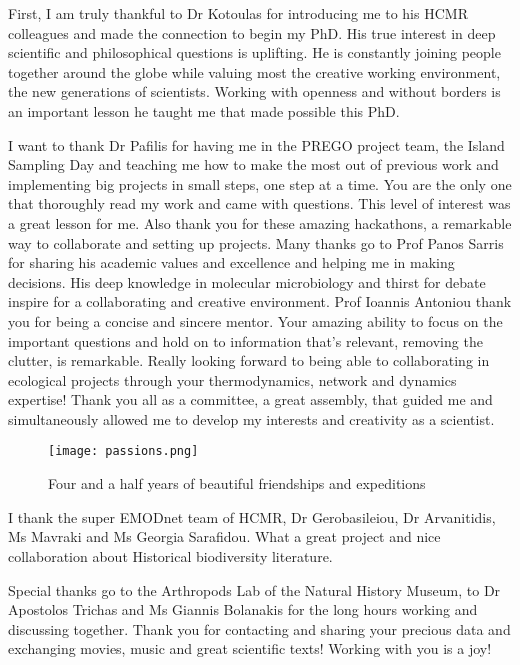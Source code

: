 \documentclass[
11pt, %
english, %
singlespacing, %
liststotoc, %
toctotoc, %
headsepline, %
]{MastersDoctoralThesis} %
\begin{document}
\begin{acknowledgements}
\addchaptertocentry{\acknowledgementname} %

First, I am truly thankful to Dr Kotoulas for introducing me to his HCMR colleagues and
made the connection to begin my PhD.
His true interest in deep scientific and philosophical questions is uplifting. He is constantly
joining people together around the globe while valuing most the creative working environment,
the new generations of scientists. Working with openness and without borders is an
important lesson he taught me that made possible this PhD.

I want to thank Dr Pafilis for having me in the PREGO project team, the Island Sampling
Day and teaching me how to make the most out
of previous work and implementing big projects in small steps, one step at a time. You are the only one that 
thoroughly read my work and came with questions. This level of interest was a great lesson for me. Also thank you 
for these amazing hackathons, a remarkable way to collaborate and setting up projects.
Many thanks go to Prof Panos Sarris for sharing his academic values and excellence and helping me in making
decisions. His deep knowledge in molecular microbiology and thirst for debate inspire for
a collaborating and creative environment. 
Prof Ioannis Antoniou thank you for being a concise and sincere mentor. Your amazing ability to focus
on the important questions and hold on to information that's relevant, removing the clutter, 
is remarkable. Really looking forward to being able to collaborating in ecological 
projects through your thermodynamics, network and dynamics expertise!
Thank you all as a committee, a great assembly, that guided me and simultaneously 
allowed me to develop my interests and creativity as a scientist.

\begin{figure}[hbt!] 
    \centering\texttt{[image: passions.png]}
    \caption{Four and a half years of beautiful friendships and expeditions}
    \label{fig:passions}
\end{figure}

I thank the super EMODnet team of HCMR, Dr Gerobasileiou, Dr Arvanitidis, Ms Mavraki and
Ms Georgia Sarafidou. What a great project and nice collaboration about Historical 
biodiversity literature.

Special thanks go to the Arthropods Lab of the Natural History Museum, to
Dr Apostolos Trichas and Ms Giannis Bolanakis for the long hours working and discussing together.
Thank you for contacting and sharing your 
precious data and exchanging movies, music and great scientific texts! Working with you is a joy!


\end{acknowledgements}
\end{document}
